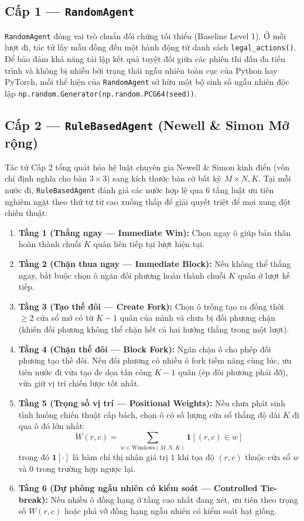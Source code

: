\documentclass[a4paper,12pt]{report}
\begin{document}
\subsection{Cấp 1 --- \texttt{RandomAgent}}
\texttt{RandomAgent} đóng vai trò chuẩn đối chứng tối thiểu (Baseline Level 1). Ở mỗi lượt đi, tác tử lấy mẫu đồng đều một hành động từ danh sách \texttt{legal\_\allowbreak actions()}. Để bảo đảm khả năng tái lập kết quả tuyệt đối giữa các phiên thi đấu đa tiến trình và không bị nhiễu bởi trạng thái ngẫu nhiên toàn cục của Python hay PyTorch, mỗi thể hiện của \texttt{RandomAgent} sở hữu một bộ sinh số ngẫu nhiên độc lập \texttt{np.random.\allowbreak Generator(\allowbreak np.random.\allowbreak PCG64(seed))}.

\subsection{Cấp 2 --- \texttt{RuleBasedAgent} (Newell \& Simon Mở rộng)}
Tác tử Cấp 2 tổng quát hóa hệ luật chuyên gia Newell \& Simon kinh điển (vốn chỉ định nghĩa cho bàn $3 \times 3$) sang kích thước bàn cờ bất kỳ $M \times N, K$. Tại mỗi nước đi, \texttt{RuleBasedAgent} đánh giá các nước hợp lệ qua 6 tầng luật ưu tiên nghiêm ngặt theo thứ tự từ cao xuống thấp để giải quyết triệt để mọi xung đột chiến thuật:
\begin{enumerate}[leftmargin=1.2cm]
    \item \textbf{Tầng 1 (Thắng ngay --- Immediate Win):} Chọn ngay ô giúp bản thân hoàn thành chuỗi $K$ quân liên tiếp tại lượt hiện tại.
    \item \textbf{Tầng 2 (Chặn thua ngay --- Immediate Block):} Nếu không thể thắng ngay, bắt buộc chọn ô ngăn đối phương hoàn thành chuỗi $K$ quân ở lượt kế tiếp.
    \item \textbf{Tầng 3 (Tạo thế đôi --- Create Fork):} Chọn ô trống tạo ra đồng thời $\ge 2$ cửa sổ mở có từ $K - 1$ quân của mình và chưa bị đối phương chặn (khiến đối phương không thể chặn hết cả hai hướng thắng trong một lượt).
    \item \textbf{Tầng 4 (Chặn thế đôi --- Block Fork):} Ngăn chặn ô cho phép đối phương tạo thế đôi. Nếu đối phương có nhiều ô fork tiềm năng cùng lúc, ưu tiên nước đi vừa tạo đe dọa tấn công $K-1$ quân (ép đối phương phải đỡ), vừa giữ vị trí chiến lược tốt nhất.
    \item \textbf{Tầng 5 (Trọng số vị trí --- Positional Weights):} Nếu chưa phát sinh tình huống chiến thuật cấp bách, chọn ô có số lượng cửa sổ thắng độ dài $K$ đi qua ô đó lớn nhất:
    \begin{equation}
        W(r, c) = \sum_{w \in \text{Windows}(M, N, K)} \mathbf{1}[(r, c) \in w]
    \end{equation}
    trong đó $\mathbf{1}[\cdot]$ là hàm chỉ thị nhận giá trị $1$ khi tọa độ $(r, c)$ thuộc cửa sổ $w$ và $0$ trong trường hợp ngược lại.
    \item \textbf{Tầng 6 (Dự phòng ngẫu nhiên có kiểm soát --- Controlled Tie-break):} Nếu nhiều ô đồng hạng ở tầng cao nhất đang xét, ưu tiên theo trọng số $W(r, c)$ hoặc phá vỡ đồng hạng ngẫu nhiên có kiểm soát hạt giống.
\end{enumerate}
\end{document}
